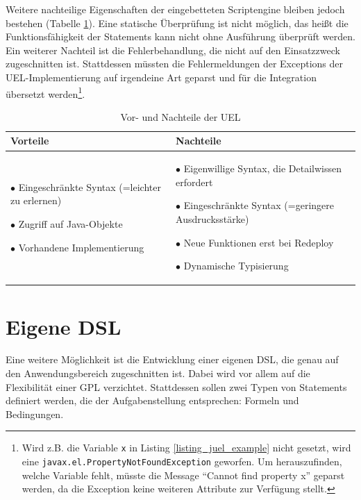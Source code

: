 Weitere nachteilige Eigenschaften der eingebetteten Scriptengine bleiben jedoch bestehen (Tabelle \ref{tbl_vergleich_uel}). Eine statische Überprüfung ist nicht möglich, das heißt die Funktionsfähigkeit der Statements kann nicht ohne Ausführung überprüft werden. Ein weiterer Nachteil ist die Fehlerbehandlung, die nicht auf den Einsatzzweck zugeschnitten ist. Stattdessen müssten die Fehlermeldungen der Exceptions der UEL-Implementierung auf irgendeine Art geparst und für die Integration übersetzt werden\footnote{Wird z.B. die Variable \texttt{x} in Listing \ref{listing_juel_example} nicht gesetzt, wird eine \texttt{javax.el.PropertyNotFoundException} geworfen. Um herauszufinden, welche Variable fehlt, müsste die Message ``Cannot find property x'' geparst werden, da die Exception keine weiteren Attribute zur Verfügung stellt.}.


\begin{table}
\begin{tabular}{|p{} | p{} |}
	\hline
	Vorteile & Nachteile \\
	\hline
	
		$\bullet$  Eingeschränkte Syntax (=leichter zu erlernen)
		 
		$\bullet$  Zugriff auf Java-Objekte
		 
		$\bullet$  Vorhandene Implementierung
	&
	
		$\bullet$  Eigenwillige Syntax, die Detailwissen erfordert
	
		$\bullet$  Eingeschränkte Syntax (=geringere Ausdrucksstärke)
		
		$\bullet$  Neue Funktionen erst bei Redeploy
		
		$\bullet$  Dynamische Typisierung
	
	\\
	\hline

\end{tabular}
\caption{Vor- und Nachteile der UEL}
\label{tbl_vergleich_uel}
\end{table}


\section{Eigene DSL}

Eine weitere Möglichkeit ist die Entwicklung einer eigenen DSL, die genau auf den Anwendungsbereich zugeschnitten ist. Dabei wird vor allem auf die Flexibilität einer GPL verzichtet. Stattdessen sollen zwei Typen von Statements definiert werden, die der Aufgabenstellung entsprechen: Formeln und Bedingungen.

